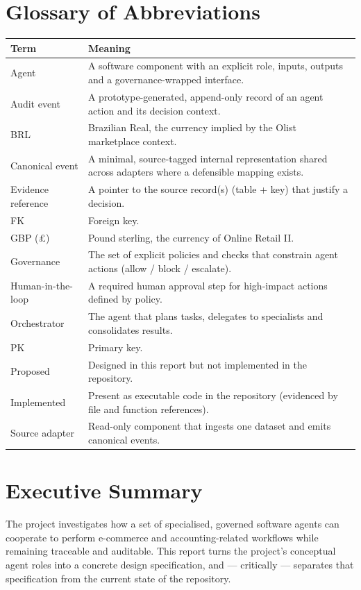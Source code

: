 \documentclass[11pt,a4paper]{article}
\begin{document}
\section*{Glossary of Abbreviations}
\begin{tabularx}{\textwidth}{L{2.6cm}X}
\toprule
\textbf{Term} & \textbf{Meaning} \\ \midrule
Agent & A software component with an explicit role, inputs, outputs and a governance-wrapped interface. \\
Audit event & A prototype-generated, append-only record of an agent action and its decision context. \\
BRL & Brazilian Real, the currency implied by the Olist marketplace context. \\
Canonical event & A minimal, source-tagged internal representation shared across adapters where a defensible mapping exists. \\
Evidence reference & A pointer to the source record(s) (table + key) that justify a decision. \\
FK & Foreign key. \\
GBP (\pounds) & Pound sterling, the currency of Online Retail II. \\
Governance & The set of explicit policies and checks that constrain agent actions (allow / block / escalate). \\
Human-in-the-loop & A required human approval step for high-impact actions defined by policy. \\
Orchestrator & The agent that plans tasks, delegates to specialists and consolidates results. \\
PK & Primary key. \\
Proposed & Designed in this report but not implemented in the repository. \\
Implemented & Present as executable code in the repository (evidenced by file and function references). \\
Source adapter & Read-only component that ingests one dataset and emits canonical events. \\
\bottomrule
\end{tabularx}

\section{Executive Summary}
The project investigates how a set of specialised, governed software agents can cooperate to perform e-commerce and accounting-related workflows while remaining traceable and auditable. This report turns the project's conceptual agent roles into a concrete design specification, and --- critically --- separates that specification from the current state of the repository.
\end{document}
